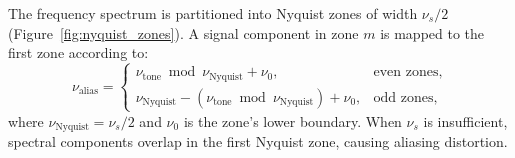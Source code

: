 The frequency spectrum is partitioned into Nyquist zones of width $\nu_s/2$ (Figure~\ref{fig:nyquist_zones}). A signal component in zone $m$ is mapped to the first zone according to:
\begin{equation}
\nu_{\text{alias}} =
\begin{cases}
\nu_{\text{tone}} \bmod \nu_\text{Nyquist} + \nu_0, & \text{even zones},\\
\nu_\text{Nyquist} - (\nu_{\text{tone}} \bmod \nu_\text{Nyquist}) + \nu_0, & \text{odd zones},
\end{cases}
\end{equation}
where $\nu_\text{Nyquist} = \nu_s/2$ and $\nu_0$ is the zone's lower boundary. When $\nu_s$ is insufficient, spectral components overlap in the first Nyquist zone, causing aliasing distortion.


